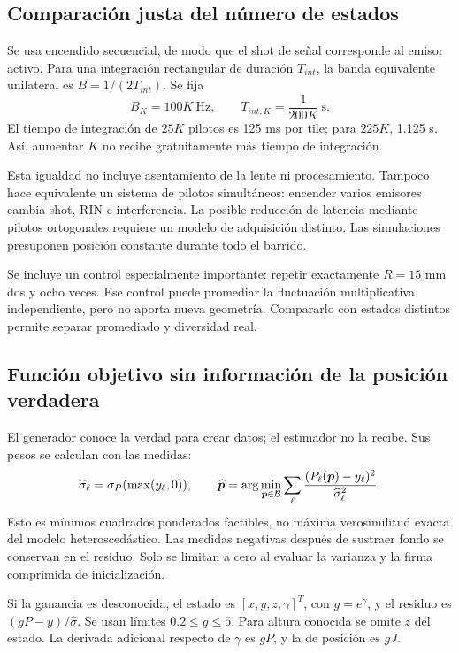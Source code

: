 \subsection{Comparación justa del número de estados}
Se usa encendido secuencial, de modo que el shot de señal corresponde al emisor activo. Para una integración rectangular de duración $T_{int}$, la banda equivalente unilateral es $B=1/(2T_{int})$. Se fija
\begin{equation}
B_K=100K\ \mathrm{Hz},\qquad T_{int,K}=\frac1{200K}\ \mathrm{s}.
\end{equation}
El tiempo de integración de $25K$ pilotos es 125 ms por tile; para $225K$, 1.125 s. Así, aumentar $K$ no recibe gratuitamente más tiempo de integración.

Esta igualdad no incluye asentamiento de la lente ni procesamiento. Tampoco hace equivalente un sistema de pilotos simultáneos: encender varios emisores cambia shot, RIN e interferencia. La posible reducción de latencia mediante pilotos ortogonales requiere un modelo de adquisición distinto. Las simulaciones presuponen posición constante durante todo el barrido.

Se incluye un control especialmente importante: repetir exactamente $R=15$ mm dos y ocho veces. Ese control puede promediar la fluctuación multiplicativa independiente, pero no aporta nueva geometría. Compararlo con estados distintos permite separar promediado y diversidad real.

\subsection{Función objetivo sin información de la posición verdadera}
El generador conoce la verdad para crear datos; el estimador no la recibe. Sus pesos se calculan con las medidas:
\begin{equation}
\widehat\sigma_\ell=\sigma_P(\max(y_\ell,0)),\qquad
\widehat{\bm{p}}=\arg\min_{\bm{p}\in\mathcal B}
\sum_\ell\frac{(P_\ell(\bm{p})-y_\ell)^2}{\widehat\sigma_\ell^2}.
\end{equation}
Esto es mínimos cuadrados ponderados factibles, no máxima verosimilitud exacta del modelo heteroscedástico. Las medidas negativas después de sustraer fondo se conservan en el residuo. Solo se limitan a cero al evaluar la varianza y la firma comprimida de inicialización.

Si la ganancia es desconocida, el estado es $[x,y,z,\gamma]^T$, con $g=e^\gamma$, y el residuo es $(gP-y)/\widehat\sigma$. Se usan límites $0.2\le g\le5$. Para altura conocida se omite $z$ del estado. La derivada adicional respecto de $\gamma$ es $gP$, y la de posición es $gJ$.

